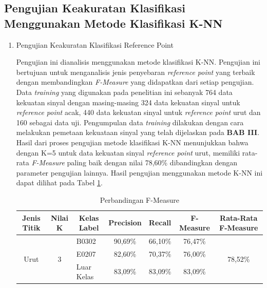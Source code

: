 \subsection{Pengujian Keakuratan Klasifikasi Menggunakan Metode Klasifikasi K-NN}
\begin{enumerate}

\item Pengujian Keakuratan Klasifikasi Reference Point

\par Pengujian ini dianalisis menggunakan metode klasifikasi K-NN. Pengujian ini bertujuan untuk menganalisis jenis penyebaran \textit{reference point} yang terbaik dengan membandingkan \textit{F-Measure} yang didapatkan dari setiap pengujian. Data \textit{training} yang digunakan pada penelitian ini sebanyak 764 data kekuatan sinyal dengan masing-masing 324 data kekuatan sinyal untuk \textit{reference point} acak, 440 data kekuatan sinyal untuk \textit{reference point} urut dan 160 sebagai data uji. Pengumpulan data \textit{training} dilakukan dengan cara melakukan pemetaan kekuataan sinyal yang telah dijelaskan pada \textbf{BAB III}. Hasil dari proses pengujian metode klasifikasi K-NN menunjukkan bahwa dengan K=5 untuk data kekuatan sinyal \textit{reference point} urut, memiliki rata-rata \textit{F-Measure} paling baik dengan nilai 78,60\% dibandingkan dengan parameter pengujian lainnya. Hasil pengujian menggunakan metode K-NN ini  dapat dilihat pada Tabel \ref{tabelfmeasure9}.
\begin{table}[H]
\fontsize{9}{12}\selectfont
\center
\caption{Perbandingan F-Measure}
\label{tabelfmeasure9}
\begin{tabular}{|c|c|l|c|c|c|c|}
\hline
Jenis Titik           & Nilai K            & \multicolumn{1}{c|}{Kelas Label} & Precision & Recall  & F-Measure & Rata-Rata F-Measure      \\ \hline
\multirow{3}{*}{Urut} & \multirow{3}{*}{3} & B0302                            & 90,69\%   & 66,10\% & 76,47\%   & \multirow{3}{*}{78,52\%} \\ \cline{3-6}
                      &                    & E0207                            & 82,60\%   & 70,37\% & 76,00\%    &                          \\ \cline{3-6}
                      &                    & Luar Kelas                       & 83,09\%   & 83,09\% & 83,09\%   &                          \\ \hline

\end{tabular}
\end{table}
\end{enumerate}
